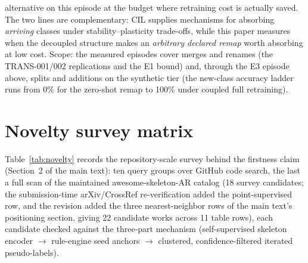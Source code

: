 \documentclass[11pt,a4paper]{article}
\begin{document}
alternative on this episode at the budget where retraining cost is actually saved. The two lines are complementary: CIL supplies mechanisms for absorbing \emph{arriving} classes under stability--plasticity trade-offs, while this paper measures when the decoupled structure makes an \emph{arbitrary declared remap} worth absorbing at low cost. Scope: the measured episodes cover merges and renames (the TRANS-001/002 replications and the E1 bound) and, through the E3 episode above, splits and additions on the synthetic tier (the new-class accuracy ladder runs from 0\% for the zero-shot remap to 100\% under coupled full retraining).

\section{Novelty survey matrix}\label{app:novelty}

Table~\ref{tab:novelty} records the repository-scale survey behind the firstness claim (Section~2 of the main text): ten query groups over GitHub code search, the last a full scan of the maintained awesome-skeleton-AR catalog (18 survey candidates; the submission-time arXiv/CrossRef re-verification added the point-supervised row, and the revision added the three nearest-neighbor rows of the main text's positioning section, giving 22 candidate works across 11 table rows), each candidate checked against the three-part mechanism (self-supervised skeleton encoder $\to$ rule-engine seed anchors $\to$ clustered, confidence-filtered iterated pseudo-labels).
\end{document}
